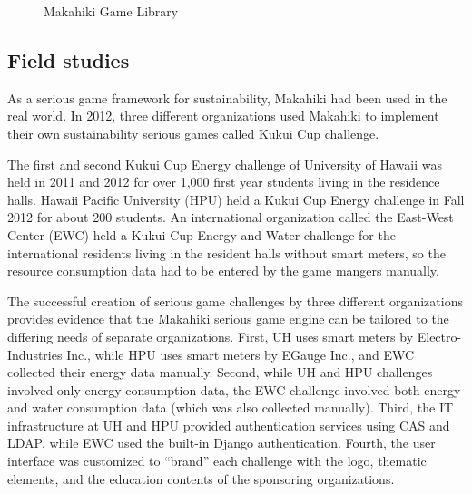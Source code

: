 \documentclass{sigchi}
\begin{document}
\begin{figure}
	\center
		\caption{Makahiki Game Library}
		\label{fig:makahiki-games}
\end{figure}

\subsection{Field studies}

As a serious game framework for sustainability, Makahiki had been used in the real world. In 2012, three different organizations used Makahiki to implement their own sustainability serious games called Kukui Cup challenge.

The first and second Kukui Cup Energy challenge of University of Hawaii was held in 2011 and 2012 for over 1,000 first year students living in the residence halls. Hawaii Pacific University (HPU) held a Kukui Cup Energy challenge in Fall 2012 for about 200 students. An international organization called the East-West Center (EWC) held a Kukui Cup Energy and Water challenge for the international residents living in the resident halls without smart meters, so the resource consumption data had to be entered by the game mangers manually.

The successful creation of serious game challenges by three different organizations provides evidence that the Makahiki serious game engine can be tailored to the differing needs of separate organizations. First, UH uses smart meters by Electro-Industries Inc., while HPU uses smart meters by EGauge Inc., and EWC collected their energy data manually. Second, while UH and HPU challenges involved only energy consumption data, the EWC challenge involved both energy and water consumption data (which was also collected manually).  Third, the IT infrastructure at UH and HPU provided authentication services using CAS and LDAP, while EWC used the built-in Django authentication. Fourth, the user interface was customized to ``brand'' each challenge with the logo, thematic elements, and the education contents of the sponsoring organizations.
\end{document}
